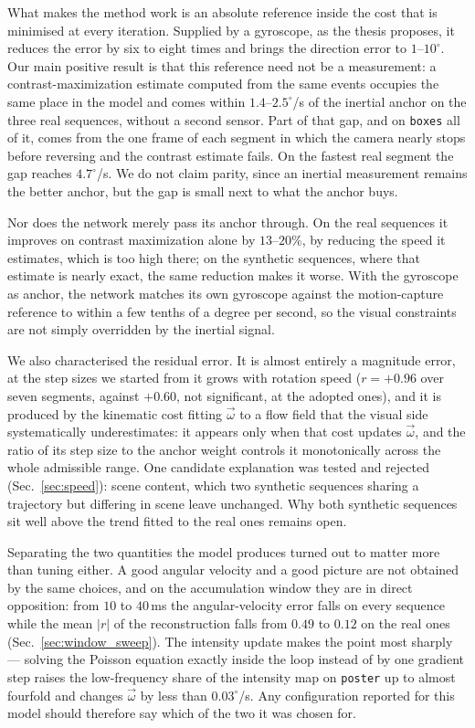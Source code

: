 \documentclass[journal]{IEEEtran}
\newcommand{\wvec}{\vec{\omega}}
\begin{document}
What makes the method work is an absolute reference inside the cost that is minimised at every iteration. Supplied by a gyroscope, as the thesis proposes, it reduces the error by six to eight times and brings the direction error to $1$--$10^\circ$. Our main positive result is that this reference need not be a measurement: a contrast-maximization estimate computed from the same events occupies the same place in the model and comes within $1.4$--$2.5^\circ$/s of the inertial anchor on the three real sequences, without a second sensor. Part of that gap, and on \texttt{boxes} all of it, comes from the one frame of each segment in which the camera nearly stops before reversing and the contrast estimate fails. On the fastest real segment the gap reaches $4.7^\circ$/s. We do not claim parity, since an inertial measurement remains the better anchor, but the gap is small next to what the anchor buys. 

Nor does the network merely pass its anchor through. On the real sequences it improves on contrast maximization alone by $13$--$20\%$, by reducing the speed it estimates, which is too high there; on the synthetic sequences, where that estimate is nearly exact, the same reduction makes it worse. With the gyroscope as anchor, the network matches its own gyroscope against the motion-capture reference to within a few tenths of a degree per second, so the visual constraints are not simply overridden by the inertial signal.

We also characterised the residual error. It is almost entirely a magnitude error, at the step sizes we started from it grows with rotation speed ($r = +0.96$ over seven segments, against $+0.60$, not significant, at the adopted ones), and it is produced by the kinematic cost fitting $\wvec$ to a flow field that the visual side systematically underestimates: it appears only when that cost updates $\wvec$, and the ratio of its step size to the anchor weight controls it monotonically across the whole admissible range. One candidate explanation was tested and rejected (Sec.~\ref{sec:speed}): scene content, which two synthetic sequences sharing a trajectory but differing in scene leave unchanged. Why both synthetic sequences sit well above the trend fitted to the real ones remains open.

Separating the two quantities the model produces turned out to matter more than tuning either. A good angular velocity and a good picture are not obtained by the same choices, and on the accumulation window they are in direct opposition: from $10$ to $40$\,ms the angular-velocity error falls on every sequence while the mean $|r|$ of the reconstruction falls from $0.49$ to $0.12$ on the real ones (Sec.~\ref{sec:window_sweep}). The intensity update makes the point most sharply --- solving the Poisson equation exactly inside the loop instead of by one gradient step raises the low-frequency share of the intensity map on \texttt{poster} up to almost fourfold and changes $\wvec$ by less than $0.03^\circ$/s. Any configuration reported for this model should therefore say which of the two it was chosen for.
\end{document}
